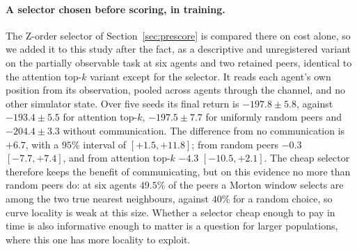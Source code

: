 \paragraph{A selector chosen before scoring, in training.} The Z-order selector
of Section~\ref{sec:prescore} is compared there on cost alone, so we added it to
this study after the fact, as a descriptive and unregistered variant on the
partially observable task at six agents and two retained peers, identical to
the attention top-$k$ variant except for the selector. It reads each agent's
own position from its observation, pooled across agents through the channel,
and no other simulator state. Over five seeds its final return is
$-197.8 \pm 5.8$, against $-193.4 \pm 5.5$ for attention top-$k$,
$-197.5 \pm 7.7$ for uniformly random peers and $-204.4 \pm 3.3$ without
communication. The difference from no communication is $+6.7$, with a $95\%$
interval of $[+1.5, +11.8]$; from random peers $-0.3$ $[-7.7, +7.4]$, and from
attention top-$k$ $-4.3$ $[-10.5, +2.1]$. The cheap selector therefore keeps the
benefit of communicating, but on this evidence no more than random peers do: at
six agents $49.5\%$ of the peers a Morton window selects are among the two true
nearest neighbours, against $40\%$ for a random choice, so curve locality is weak at
this size. Whether a selector cheap enough to pay in time is also informative
enough to matter is a question for larger populations, where this one has more
locality to exploit.
